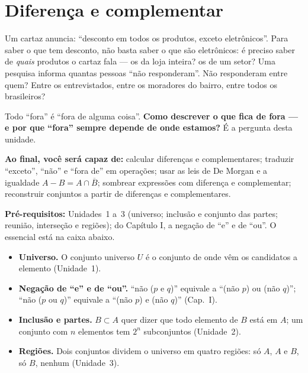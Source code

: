 \clearpage
\section{Diferença e complementar}

\Prefacio
\begin{prefacio}

Um cartaz anuncia: \enquote{desconto em todos os produtos, exceto eletrônicos}. Para saber o que tem desconto, não basta saber o que são eletrônicos: é preciso saber de \emph{quais} produtos o cartaz fala — os da loja inteira? os de um setor? Uma pesquisa informa quantas pessoas \enquote{não responderam}. Não responderam entre quem? Entre os entrevistados, entre os moradores do bairro, entre todos os brasileiros?

Todo \enquote{fora} é \enquote{fora de alguma coisa}. \textbf{Como descrever o que fica de fora — e por que \enquote{fora} sempre depende de onde estamos?} É a pergunta desta unidade.

\textbf{Ao final, você será capaz de:} calcular diferenças e complementares; traduzir \enquote{exceto}, \enquote{não} e \enquote{fora de} em operações; usar as leis de De Morgan e a igualdade $A-B=A\cap\overline{B}$; sombrear expressões com diferença e complementar; reconstruir conjuntos a partir de diferenças e complementares.

\textbf{Pré-requisitos:} Unidades~1 a~3 (universo; inclusão e conjunto das partes; reunião, interseção e regiões); do Capítulo I, a negação de \enquote{e} e de \enquote{ou}. O essencial está na caixa abaixo.
\end{prefacio}

\begin{minimo}
\begin{itemize}[leftmargin=1.4em,itemsep=1pt]
  \item \textbf{Universo.} O conjunto universo $U$ é o conjunto de onde vêm os candidatos a elemento (Unidade~1).
  \item \textbf{Negação de \enquote{e} e de \enquote{ou}.} \enquote{não ($p$ e $q$)} equivale a \enquote{(não $p$) ou (não $q$)}; \enquote{não ($p$ ou $q$)} equivale a \enquote{(não $p$) e (não $q$)} (Cap.~I).
  \item \textbf{Inclusão e partes.} $B\subset A$ quer dizer que todo elemento de $B$ está em $A$; um conjunto com $n$ elementos tem $2^{n}$ subconjuntos (Unidade~2).
  \item \textbf{Regiões.} Dois conjuntos dividem o universo em quatro regiões: só $A$, $A$ e $B$, só $B$, nenhum (Unidade~3).
\end{itemize}
\end{minimo}

